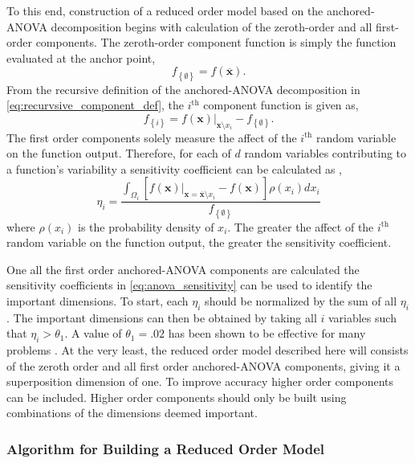To this end, construction of a reduced order model based on the anchored-\ac{ANOVA} decomposition begins with calculation of the zeroth-order and all first-order components. The zeroth-order component function is simply the function evaluated at the anchor point,
\begin{equation} \label{eq:zeroth_component}
   f_{\left\{\emptyset\right\}} = f(\overline{\textbf{x}}).  
\end{equation}  
From the recursive definition of the anchored-\ac{ANOVA} decomposition in \ref{eq:recurvsive_component_def}, the $i^{\text{th}}$ component function is given as,
\begin{equation} \label{eq:first_component}
   f_{\left\{i\right\}} = f(\textbf{x})\vert_{
    \textbf{x}\setminus x_i} - f_{\left\{\emptyset\right\}}. 
\end{equation} 
The first order components solely measure the affect of the $i^{\text{th}}$ random variable on the function output. Therefore, for each of $d$ random variables contributing to a function's variability a sensitivity coefficient can be calculated as \cite{AHSGC_HighDimensions},
\begin{equation} \label{eq:anova_sensitivity}
   \eta_i = \frac{
    \int_{\Omega_i}
     \left[f(\textbf{x})\vert_{
     \textbf{x}=\overline{\textbf{x}}\setminus x_i}
      -f(\textbf{x}) \right]\rho(x_i)dx_i}
       {
       f_{\left\{\emptyset\right\}}}
\end{equation}
where $\rho(x_i)$ is the probability density of $x_i$. The greater the affect of the $i^{\text{th}}$ random variable on the function output, the greater the sensitivity coefficient.

One all the first order anchored-\ac{ANOVA} components are calculated the sensitivity coefficients in \ref{eq:anova_sensitivity} can be used to identify the important dimensions. To start, each $\eta_i$ should be normalized by the sum of all $\eta_i$. The important dimensions can then be obtained by taking all $i$ variables such that $\eta_i > \theta_1$. A value of $\theta_1 = .02$ has been shown to be effective for many problems \cite{Hesthaven_ANOVA}. At the very least, the reduced order model described here will consists of the zeroth order and all first order anchored-\ac{ANOVA} components, giving it a superposition dimension of one. To improve accuracy higher order components can be included. Higher order components should only be built using combinations of the dimensions deemed important.    


\subsubsection{Algorithm for Building a Reduced Order Model} \label{subsubsec:full_algorithm}

          
